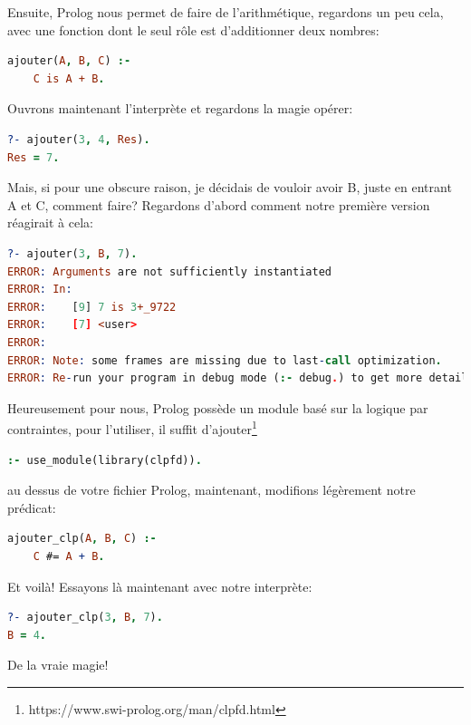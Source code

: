 \documentclass[a4paper, 12pt]{article}
\numberwithin{equation}{subsection}
\begin{document}
Ensuite, Prolog nous permet de faire de l'arithmétique, regardons un peu cela, avec une fonction dont le seul rôle est d'additionner deux nombres:
\begin{lstlisting}[language=Prolog]
ajouter(A, B, C) :-
    C is A + B.
\end{lstlisting}
Ouvrons maintenant l'interprète et regardons la magie opérer:
\begin{lstlisting}[language=Prolog]
?- ajouter(3, 4, Res).
Res = 7.
\end{lstlisting}
Mais, si pour une obscure raison, je décidais de vouloir avoir B, juste en entrant A et C, comment faire? Regardons d'abord comment notre première version réagirait à cela:
\begin{lstlisting}[language=Prolog]
?- ajouter(3, B, 7).
ERROR: Arguments are not sufficiently instantiated
ERROR: In:
ERROR:    [9] 7 is 3+_9722
ERROR:    [7] <user>
ERROR:
ERROR: Note: some frames are missing due to last-call optimization.
ERROR: Re-run your program in debug mode (:- debug.) to get more detail.
\end{lstlisting}
Heureusement pour nous, Prolog possède un module basé sur la logique par contraintes, pour l'utiliser, il suffit d'ajouter\footnote{https://www.swi-prolog.org/man/clpfd.html}
\begin{lstlisting}[language=Prolog]
:- use_module(library(clpfd)).
\end{lstlisting}
au dessus de votre fichier Prolog, maintenant, modifions légèrement notre prédicat:
\begin{lstlisting}[language=Prolog]
ajouter_clp(A, B, C) :-
    C #= A + B.
\end{lstlisting}
Et voilà! Essayons là maintenant avec notre interprète:
\begin{lstlisting}[language=Prolog]
?- ajouter_clp(3, B, 7).
B = 4.
\end{lstlisting}
De la vraie magie!
\end{document}
